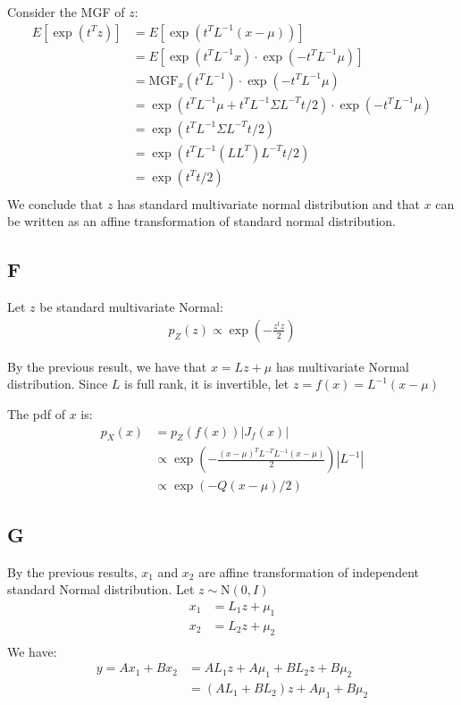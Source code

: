 \documentclass{article}
\begin{document}
Consider the MGF of \(z\):
\begin{align*}
E[\exp(t^Tz)] &= E[\exp(t^TL^{-1}(x-\mu))]\\
&= E[\exp(t^TL^{-1}x) \cdot \exp(-t^TL^{-1}\mu)]\\
&= \mathrm{MGF}_x(t^TL^{-1}) \cdot \exp(-t^TL^{-1}\mu)\\
&= \exp(t^TL^{-1}\mu + t^TL^{-1}\Sigma L^{-T}t/2) \cdot \exp(-t^TL^{-1}\mu)\\
&= \exp(t^TL^{-1}\Sigma L^{-T}t/2)\\
&= \exp(t^TL^{-1} (LL^T) L^{-T}t/2)\\
&= \exp(t^Tt/2)\\
\end{align*}
We conclude that \(z\) has standard multivariate normal distribution and that \(x\) can be written as an affine transformation of standard normal distribution.

\subsection*{F}
Let \(z\) be standard multivariate Normal:
\begin{align*}
p_Z(z) \propto \exp\left(-\frac{z^tz}{2}\right)
\end{align*}

By the previous result, we have that \(x = Lz + \mu\) has multivariate Normal distribution. Since \(L\) is full rank, it is invertible, let \(z = f(x) = L^{-1}(x - \mu)\)

The pdf of \(x\) is:
\begin{align*}
p_X(x) &= p_Z(f(x)) |J_f(x)|\\
& \propto \exp\left(-\frac{(x-\mu)^TL^{-T} L^{-1}(x-\mu)}{2}\right) |L^{-1}|\\
& \propto \exp( -Q(x-\mu)/2)
\end{align*}


\subsection*{G}
By the previous results, \(x_1\) and \(x_2\) are affine transformation of independent standard Normal distribution. Let \(z \sim \mbox{N}(0, I)\)
\begin{align*}
x_1 &= L_1z + \mu_1\\
x_2 &= L_2z + \mu_2\\
\end{align*}
We have:
\begin{align*}
y = Ax_1 + Bx_2 &= AL_1z +  A\mu_1 + BL_2z + B\mu_2\\
&= (AL_1 + BL_2)z +  A\mu_1 + B\mu_2\\
\end{align*}
\end{document}
